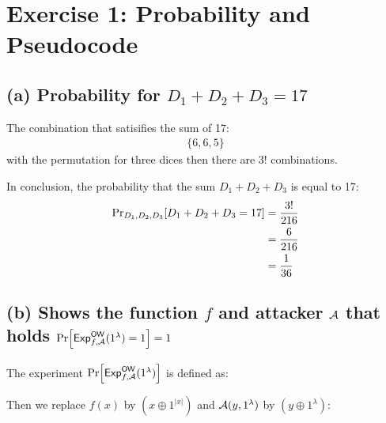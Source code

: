\section{Exercise 1: Probability and Pseudocode}

\subsection{(a) Probability for \(D_1 + D_2 + D_3 = 17 \)}
The combination that satisifies the sum of 17:
\begin{align*}
    \{6, 6, 5\}
\end{align*}
with the permutation for three dices then there are \(3!\) combinations.

In conclusion, the probability that the sum \(D_1 + D_2 + D_3 \) is equal
to 17:
\begin{align*}
    \probsub{D_1,D_2,D_3}{D_1+D_2+D_3=17} &= \frac{3!}{216} \\
    &= \frac{6}{216} \\
    &= \frac{1}{36}
\end{align*}


\subsection{(b) Shows the function \(f\) and attacker \(\mathcal{A}\) that holds
            \(\prob{\mathsf{Exp}_{f, \adv}^{\mathsf{OW}}(1^\lambda) = 1} = 1\)}

The experiment \(\prob{\mathsf{Exp}_{f, \adv}^{\mathsf{OW}}(1^\lambda)}\) is defined as:
\begin{center}
\end{center}

Then we replace \(f(x)\) by \(\left(x \oplus 1^{\lvert x \rvert}\right)\) and
\(\mathcal{A}(y, 1^{\lambda})\) by \(\left(y \oplus 1^{\lambda}\right)\):
\begin{center}
\end{center}

